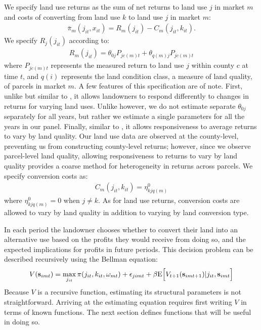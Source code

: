\documentclass[11pt]{article}
\newcommand{\Exp}{\textnormal{E}}
\begin{document}
We specify land use returns as the sum of net returns to land use $j$ in market $m$ and costs of converting from land use $k$ to land use $j$ in market $m$:
\begin{align}
\bar{\pi}_m(j_{it},x_{it}) = R_{m}(j_{it}) - C_{m}(j_{it},k_{it}).
\end{align}
We specify $R_{j}(j_{it})$ according to:
\begin{align} \label{eq:rentspec}
R_{m}(j_{it}) = \theta_{0j} P_{jc(m)t} + \theta_{q(m)j}P_{jc(m)t}
\end{align}
where $P_{jc(m)t}$ represents the measured return to land use $j$ within county $c$ at time $t$, and $q(i)$ represents the land condition class, a measure of land quality, of parcels in market $m$. A few features of this specification are of note. First, unlike \citet{scott2014} but similar to \citet{lubowski2006}, it allows landowners to respond differently to changes in returns for varying land uses. Unlike \citet{lubowski2006} however, we do not estimate separate $\theta_{0j}$ separately for all years, but rather we estimate a single parameters for all the years in our panel. Finally, similar to \citet{lubowski2006}, it allows responsiveness to average returns to vary by land quality. Our land use data are observed at the county-level, preventing us from constructing county-level returns; however, since we observe parcel-level land quality, allowing responsiveness to returns to vary by land quality provides a coarse method for heterogeneity in returns across parcels. We specify conversion costs as: 
\begin{align} \label{eq:costspec}
C_{m}(j_{it},k_{it})  = \eta^0_{kjq(m)}
\end{align}
where $\eta^0_{kjq(m)} = 0$ when $j\neq k$. As for land use returns, conversion costs are allowed to vary by land quality in addition to varying by land conversion type.

In each period the landowner chooses whether to convert their land into an alternative use based on the profits they would receive from doing so, and the expected implications for profits in future periods. This decision problem can be described recursively using the Bellman equation:
\begin{align}
V({\bf s}_{imt}) = \max_{j_{it}} \pi(j_{it},k_{it},\omega_{mt}) + \epsilon_{jimt} + \beta \Exp\Big[V_{t+1}({\bf s}_{imt+1})|j_{it},{\bf s}_{imt}\Big]
\end{align}
Because $V$ is a recursive function, estimating its structural parameters is not straightforward. Arriving at the estimating equation requires first writing $V$ in terms of known functions. The next section defines functions that will be useful in doing so.
\end{document}
